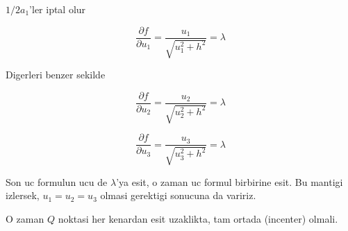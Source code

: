 \documentclass[12pt,fleqn]{article}
\begin{document}
$1/2a_1$'ler iptal olur

\[
\frac{\partial f}{\partial u_1} =
\frac{u_1}{\sqrt{u_1^2 + h^2}} = \lambda 
\]

Digerleri benzer sekilde

\[
\frac{\partial f}{\partial u_2} =
\frac{u_2}{\sqrt{u_2^2 + h^2}} = \lambda 
\]

\[
\frac{\partial f}{\partial u_3} =
\frac{u_3}{\sqrt{u_3^2 + h^2}} = \lambda 
\]

Son uc formulun ucu de $\lambda$'ya esit, o zaman uc formul birbirine
esit. Bu mantigi izlersek, $u_1 = u_2 = u_3$ olmasi gerektigi sonucuna da
variriz. 

O zaman $Q$ noktasi her kenardan esit uzaklikta, tam ortada (incenter)
olmali. 
\end{document}
